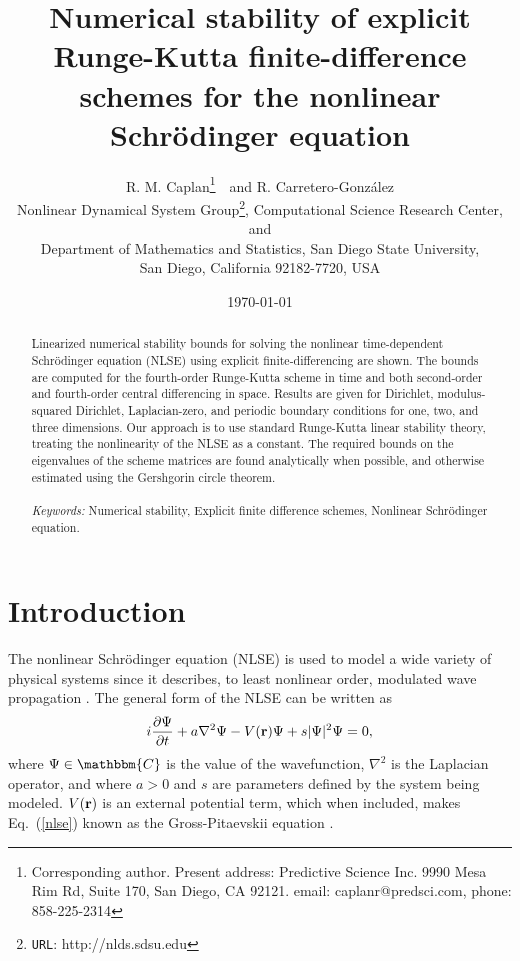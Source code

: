 \documentclass{article}
\begin{document}
\title{Numerical stability of explicit Runge-Kutta finite-difference schemes for the nonlinear Schr{\"o}dinger equation}
\author{R. M. Caplan\footnote{Corresponding author.  Present address:  Predictive Science Inc.  9990 Mesa Rim Rd, Suite 170, San Diego, CA 92121. email: caplanr@predsci.com, phone: 858-225-2314}~~and R. Carretero-Gonz{\'a}lez\\[1.0ex]
Nonlinear Dynamical System Group\footnote{\texttt{URL}: http://nlds.sdsu.edu},
Computational Science Research Center, and\\
Department of Mathematics and Statistics,
San Diego State University,\\
San Diego, California 92182-7720, USA\\
}
\date{\today}
\maketitle
\begin{abstract}
Linearized numerical stability bounds for solving the nonlinear time-dependent Schr{\"o}dinger equation (NLSE) using explicit finite-differencing are shown. The bounds are computed for the fourth-order Runge-Kutta scheme in time and both second-order and fourth-order central differencing in space.  Results are given for Dirichlet, modulus-squared Dirichlet, Laplacian-zero, and periodic boundary conditions for one, two, and three dimensions.  Our approach is to use standard Runge-Kutta linear stability theory, treating the nonlinearity of the NLSE as a constant.  The required bounds on the eigenvalues of the scheme matrices are found analytically when possible, and otherwise estimated using the Gershgorin circle theorem.
\\
\\
\textit{Keywords:} Numerical stability, Explicit finite difference schemes, Nonlinear Schr{\"o}dinger equation.
\end{abstract}

\section{Introduction}
The nonlinear Schr{\"o}dinger equation (NLSE) is used to model a wide variety of physical systems since it describes, to least nonlinear order, modulated wave propagation \cite{NLSE_nlpdebook}.  The general form of the NLSE can be written as
\begin{equation}
\label{nlse}
i\frac{\partial \Psi}{\partial t} + a\nabla^2\Psi - V({\bf r})\Psi + s|\Psi|^2 \Psi = 0,
\end{equation}
where $\Psi \in \mathbbm{C} $ is the value of the wavefunction, $\nabla^2$ is the Laplacian operator, and where $a>0$ and $s$ are parameters defined by the system being modeled.  $V(\bf{r})$ is an external potential term, which when included, makes Eq.~(\ref{nlse}) known as the Gross-Pitaevskii equation \cite{BEC_RCbook}.
\end{document}
